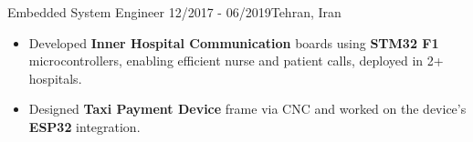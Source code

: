 \resumeSubheadingReza
{Embedded System Engineer}{}
{12/2017 - 06/2019}{Tehran, Iran}
{
    \vspace{-12pt}
    \begin{itemize}
        \item{Developed \textbf{Inner Hospital Communication} boards using \textbf{STM32 F1} microcontrollers, enabling efficient nurse and patient calls, deployed in 2+ hospitals.}
        \item{Designed \textbf{Taxi Payment Device} frame via CNC and worked on the device's \textbf{ESP32} integration.}
    \end{itemize}
}

